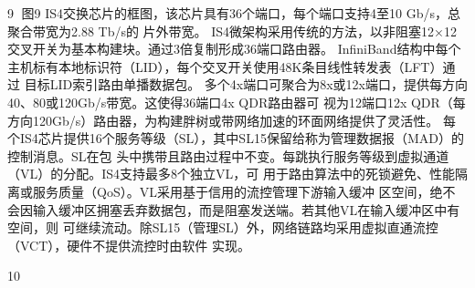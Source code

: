                                                                9
图9 IS4交换芯片的框图，该芯片具有36个端口，每个端口支持4至10 Gb/s，总聚合带宽为2.88 Tb/s的
片外带宽。
IS4微架构采用传统的方法，以非阻塞12×12交叉开关为基本构建块。通过3倍复制形成36端口路由器。
InfiniBand结构中每个主机标有本地标识符（LID），每个交叉开关使用48K条目线性转发表（LFT）通过
目标LID索引路由单播数据包。
多个4x端口可聚合为8x或12x端口，提供每方向40、80或120Gb/s带宽。这使得36端口4x QDR路由器可
视为12端口12x QDR（每方向120Gb/s）路由器，为构建胖树或带网络加速的环面网络提供了灵活性。
每个IS4芯片提供16个服务等级（SL），其中SL15保留给称为管理数据报（MAD）的控制消息。SL在包
头中携带且路由过程中不变。每跳执行服务等级到虚拟通道（VL）的分配。IS4支持最多8个独立VL，可
用于路由算法中的死锁避免、性能隔离或服务质量（QoS）。VL采用基于信用的流控管理下游输入缓冲
区空间，绝不会因输入缓冲区拥塞丢弃数据包，而是阻塞发送端。若其他VL在输入缓冲区中有空间，则
可继续流动。除SL15（管理SL）外，网络链路均采用虚拟直通流控（VCT），硬件不提供流控时由软件
实现。




                                                       10
